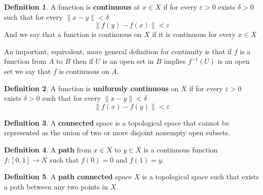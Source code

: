 \documentclass[11pt,a4paper]{article}
\theoremstyle{definition}
\newtheorem{definition}{Definition}[section]
\theoremstyle{plain}
\begin{document}
	\begin{definition}
	A function is \textbf{continuous} at $x\in X$ if for every $\varepsilon > 0$
	exists $\delta > 0$ such that for every $\|x-y\| < \delta$
	\[
		\|f(y) - f(x)\| < \varepsilon
	\]
	And we say that a function is continuous on $X$ if it is continuous
	for every $x\in X$
	\end{definition}
	An important, equivalent, more general definition for continuity is that
	if $f$ is a function from $A$ to $B$ then if $U$ is an open set in $B$
	implies $f^{-1}(U)$ is an open set we say that $f$ is continuous on $A$.
	\begin{definition}
	A function is \textbf{uniformly continuous} on $X$ if for every 
	$\varepsilon > 0$ exists $\delta > 0$ such that for every 
	$\|x-y\| < \delta$
	\[
		\|f(x) - f(y)\| < \varepsilon
	\]
	\end{definition}
	\begin{definition}
	A \textbf{connected} space is a topological space that cannot be 
	represented as the union of two or more disjoint nonempty open subsets. 
	\end{definition}
	\begin{definition}
	A \textbf{path} from $x\in X$ to $y\in X$ is a continuous function 
  $f \colon [0,1] \to X$ such that $f(0) = 0$ and $f(1) = y$.
	\end{definition}
	\begin{definition}
	A \textbf{path connected} space $X$ is a topological space such that 
	exists a path between any two points in $X$.
	\end{definition}
	
	\newpage
	
\end{document}
